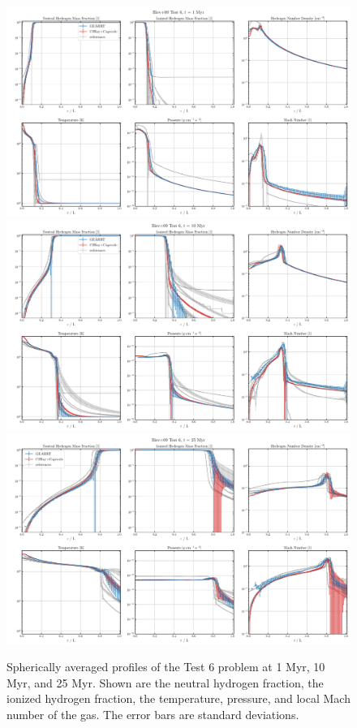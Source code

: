 \begin{figure}
\centering
\includegraphics[width=.8\textwidth]{figures/RHD/Iliev6/output_0001-Profiles.png}\\
\includegraphics[width=.8\textwidth]{figures/RHD/Iliev6/output_0010-Profiles.png}\\
\includegraphics[width=.8\textwidth]{figures/RHD/Iliev6/output_0025-Profiles.png}
\caption{
Spherically averaged profiles of the Test 6 problem at 1 Myr, 10 Myr, and 25 Myr. Shown are the
neutral hydrogen fraction, the ionized hydrogen fraction, the temperature, pressure, and local
Mach number of the gas. The error bars are standard deviations.
}
\label{fig:iliev6}
\end{figure}





